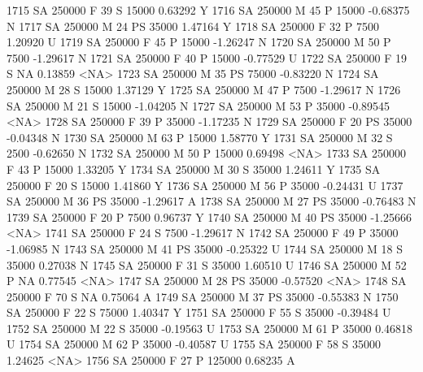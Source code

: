 \documentclass{article}
\begin{document}
\begin{Schunk}
\begin{Soutput}
1715     SA     250000   F  39         S  15000   0.63292    Y
1716     SA     250000   M  45         P  15000  -0.68375    N
1717     SA     250000   M  24        PS  35000   1.47164    Y
1718     SA     250000   F  32         P   7500   1.20920    U
1719     SA     250000   F  45         P  15000  -1.26247    N
1720     SA     250000   M  50         P   7500  -1.29617    N
1721     SA     250000   F  40         P  15000  -0.77529    U
1722     SA     250000   F  19         S     NA   0.13859 <NA>
1723     SA     250000   M  35        PS  75000  -0.83220    N
1724     SA     250000   M  28         S  15000   1.37129    Y
1725     SA     250000   M  47         P   7500  -1.29617    N
1726     SA     250000   M  21         S  15000  -1.04205    N
1727     SA     250000   M  53         P  35000  -0.89545 <NA>
1728     SA     250000   F  39         P  35000  -1.17235    N
1729     SA     250000   F  20        PS  35000  -0.04348    N
1730     SA     250000   M  63         P  15000   1.58770    Y
1731     SA     250000   M  32         S   2500  -0.62650    N
1732     SA     250000   M  50         P  15000   0.69498 <NA>
1733     SA     250000   F  43         P  15000   1.33205    Y
1734     SA     250000   M  30         S  35000   1.24611    Y
1735     SA     250000   F  20         S  15000   1.41860    Y
1736     SA     250000   M  56         P  35000  -0.24431    U
1737     SA     250000   M  36        PS  35000  -1.29617    A
1738     SA     250000   M  27        PS  35000  -0.76483    N
1739     SA     250000   F  20         P   7500   0.96737    Y
1740     SA     250000   M  40        PS  35000  -1.25666 <NA>
1741     SA     250000   F  24         S   7500  -1.29617    N
1742     SA     250000   F  49         P  35000  -1.06985    N
1743     SA     250000   M  41        PS  35000  -0.25322    U
1744     SA     250000   M  18         S  35000   0.27038    N
1745     SA     250000   F  31         S  35000   1.60510    U
1746     SA     250000   M  52         P     NA   0.77545 <NA>
1747     SA     250000   M  28        PS  35000  -0.57520 <NA>
1748     SA     250000   F  70         S     NA   0.75064    A
1749     SA     250000   M  37        PS  35000  -0.55383    N
1750     SA     250000   F  22         S  75000   1.40347    Y
1751     SA     250000   F  55         S  35000  -0.39484    U
1752     SA     250000   M  22         S  35000  -0.19563    U
1753     SA     250000   M  61         P  35000   0.46818    U
1754     SA     250000   M  62         P  35000  -0.40587    U
1755     SA     250000   F  58         S  35000   1.24625 <NA>
1756     SA     250000   F  27         P 125000   0.68235    A

\end{Soutput}
\end{Schunk}
\end{document}
